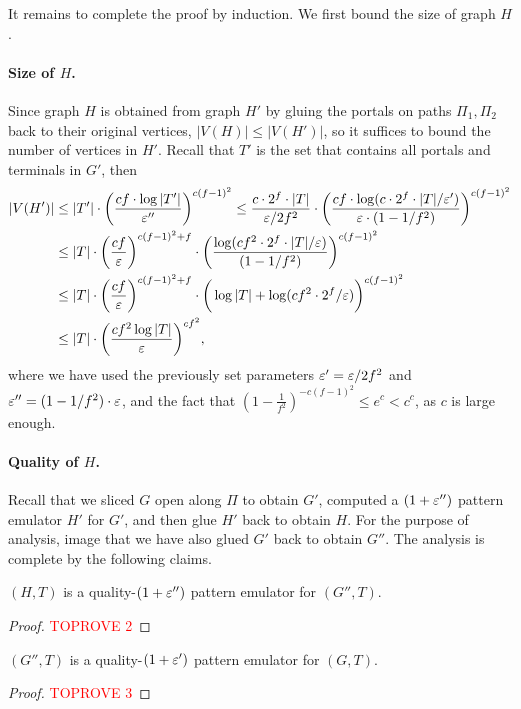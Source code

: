 It remains to complete the proof by induction. We first bound the size of graph $H$.
 
\paragraph{Size of $H$.} Since graph $H$ is obtained from graph $H'$ by gluing the portals on paths $\Pi_1,\Pi_2$ back to their original vertices, $|V(H)|\le |V(H')|$, so it suffices to bound the number of vertices in $H'$.
Recall that $T'$ is the set that contains all portals and terminals in $G'$, then
%
\[
\begin{split}
|V(H')| &
\le |T'|\cdot \bigg(\frac{cf\cdot \log |T'|}{{\varepsilon}''}\bigg)^{c(f-1)^2}
\le \frac{c\cdot 2^f\cdot |T|}{{\varepsilon}/2f^2}\cdot \bigg(\frac{cf\cdot \log (c\cdot 2^f\cdot |T|/{\varepsilon}')}{{\varepsilon}\cdot (1-1/f^2)}\bigg)^{c(f-1)^2}\\
&  \le |T|\cdot \bigg(\frac{cf}{{\varepsilon}}\bigg)^{c(f-1)^2+f}\cdot \bigg(\frac{\log (cf^2\cdot 2^f\cdot |T|/{\varepsilon})}{(1-1/f^2)}\bigg)^{c(f-1)^2}\\
& \le |T|\cdot \bigg(\frac{cf}{{\varepsilon}}\bigg)^{c(f-1)^2+f}\cdot \bigg(\log |T|+ \log (cf^2\cdot 2^f/{\varepsilon})\bigg)^{c(f-1)^2}\\
& \le |T|\cdot \bigg(\frac{cf^2 \log |T|}{{\varepsilon}}\bigg)^{cf^2},
\end{split}
\]
where we have used the previously set parameters ${\varepsilon}'={\varepsilon}/2f^2$ and ${\varepsilon}''=(1-1/f^2)\cdot {\varepsilon}$, and the fact that $(1-\frac{1}{f^2})^{-c(f-1)^2}\le e^{c}< c^{c}$, as $c$ is large enough.



\paragraph{Quality of $H$.}
Recall that we sliced $G$ open along $\Pi$ to obtain $G'$, computed a $(1+{\varepsilon}'')$ pattern emulator $H'$ for $G'$, and then glue $H'$ back to obtain $H$.
For the purpose of analysis, image that we have also glued $G'$ back to obtain $G''$. The analysis is complete by the following claims.



\begin{claim}
\label{clm: cut glue emulator}
$(H,T)$ is a quality-$(1+{\varepsilon}'')$ pattern emulator for $(G'',T)$.
\end{claim}
\begin{proof}\textcolor{red}{TOPROVE 2}\end{proof}

\begin{claim}
	\label{clm: cut glue}
	$(G'',T)$ is a quality-$(1+{\varepsilon}')$ pattern emulator for $(G,T)$.
\end{claim}
\begin{proof}\textcolor{red}{TOPROVE 3}\end{proof}




